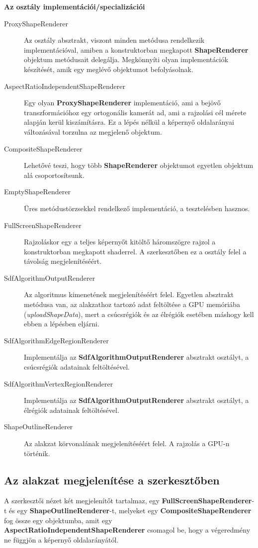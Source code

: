\textbf{Az osztály implementációi/specializációi}

\begin{description}
    \item[ProxyShapeRenderer] Az osztály absztrakt, viszont minden metódusa rendelkezik implementációval, amiben a konstruktorban megkapott \textbf{ShapeRenderer} objektum metódusait delegálja. Megkönnyíti olyan implementációk készítését, amik egy meglévő objektumot befolyásolnak.
    \item[AspectRatioIndependentShapeRenderer] Egy olyan \textbf{ProxyShapeRenderer} implementáció, ami a bejövő transzformációhoz egy ortogonális kamerát ad, ami a rajzolási cél mérete alapján kerül kiszámításra. Ez a lépés nélkül a képernyő oldalarányai változásával torzulna az megjelenő objektum.
    \item[CompositeShapeRenderer] Lehetővé teszi, hogy több \textbf{ShapeRenderer} objektumot egyetlen objektum alá csoportosítsunk.
    \item[EmptyShapeRenderer] Üres metódustörzsekkel rendelkező implementáció, a tesztelésben hasznos.
    \item[FullScreenShapeRenderer] Rajzoláskor egy a teljes képernyőt kitöltő háromszögre rajzol a konstruktorban megkapott shaderrel. A szerkesztőben ez a osztály felel a távolság megjelenítéséért.
    \item[SdfAlgorithmOutputRenderer] Az algoritmus kimenetének megjelenítéséért felel. Egyetlen absztrakt metódusa van, az alakzathoz tartozó adat feltöltése a GPU memóriába (\textit{uploadShapeData}), mert a csúcsrégiók és az élrégiók esetében máshogy kell ebben a lépésben eljárni.
    \item[SdfAlgorithmEdgeRegionRenderer] Implementálja az \textbf{SdfAlgorithmOutputRenderer} absztrakt osztályt, a csúcsrégiók adatainak feltöltésével.
    \item[SdfAlgorithmVertexRegionRenderer] Implementálja az \textbf{SdfAlgorithmOutputRenderer} absztrakt osztályt, a élrégiók adatainak feltöltésével.
    \item[ShapeOutlineRenderer] Az alakzat körvonalának megjelenítéséért felel. A rajzolás a GPU-n történik.
\end{description}

\subsection{Az alakzat megjelenítése a szerkesztőben}

A szerkesztői nézet két megjelenítőt tartalmaz, egy \textbf{FullScreenShapeRenderer}-t és egy \textbf{ShapeOutlineRenderer}-t, melyeket egy \textbf{CompositeShapeRenderer} fog össze egy objektumba, amit egy \textbf{AspectRatioIndependentShapeRenderer} csomagol be, hogy a végeredmény ne függjön a képernyő oldalarányától.

